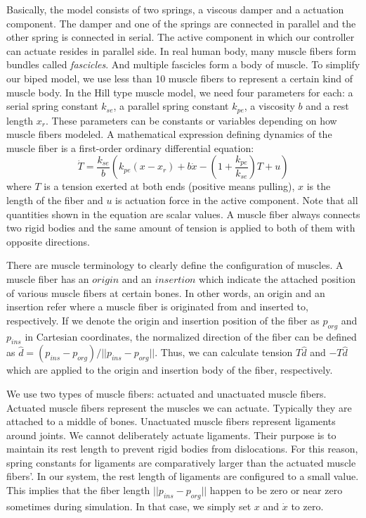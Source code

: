 \documentclass{acm_proc_article-sp}
\begin{document}
\noindent Basically, the model consists of two springs, a viscous damper and a actuation component.
The damper and one of the springs are connected in parallel and the other spring is
connected in serial. The active component in which our controller
can actuate resides in parallel side.
In real human body, many muscle fibers form bundles called \emph{fascicles}.
And multiple fascicles form a body of muscle.
To simplify our biped model, we use less than 10 muscle fibers to represent a certain kind of muscle body.
In the Hill type muscle model, we need four parameters for each:
a serial spring constant $k_{se}$, a parallel spring constant $k_{pe}$, a viscosity $b$ and a rest length $x_{r}$.
These parameters can be constants or variables depending on how muscle fibers modeled.
A mathematical expression defining dynamics of the muscle fiber is a first-order ordinary differential equation:
\begin{equation}\label{Tension}
\dot{T} = \frac{k_{se}}{b} \left( k_{pe}(x-x_{r})+b\dot{x}-\left(1+\frac{k_{pe}}{k_{se}}\right)T+u   \right)
\end{equation}
where $T$ is a tension exerted at both ends (positive means pulling), $x$ is the length of the fiber and $u$ is actuation force in the active component.
Note that all quantities shown in the equation are scalar values.
A muscle fiber always connects two rigid bodies and the same amount of
tension is applied to both of them with opposite directions.


There are muscle terminology to clearly define the configuration of muscles.
A muscle fiber has an $origin$ and an $insertion$ which indicate the attached position
of various muscle fibers at certain bones.
In other words, an origin and an insertion refer where a muscle fiber is originated from and inserted to, respectively.
If we denote the origin and insertion position of the fiber as $p_{org}$ and $p_{ins}$ in Cartesian coordinates,
the normalized direction of the fiber can be defined as $\hat{d}=(p_{ins}-p_{org})/||p_{ins}-p_{org}||$.
Thus, we can calculate tension $T\hat{d}$ and $-T\hat{d}$ which are applied to the origin and insertion body of the fiber, respectively.

We use two types of muscle fibers: actuated and unactuated muscle fibers.
Actuated muscle fibers represent the muscles we can actuate. Typically
they are attached to a middle of bones. Unactuated muscle fibers represent
ligaments around joints. We cannot deliberately actuate ligaments. Their
purpose is to maintain its rest length to prevent rigid bodies from
dislocations. For this reason, spring constants for ligaments are
comparatively larger than the actuated muscle fibers'.
In our system, the rest length of ligaments are configured to a small value.
This implies that the fiber length $||p_{ins}-p_{org}||$ happen to be zero
or near zero sometimes during simulation. In that case, we simply set
$x$ and $\dot{x}$ to zero.
\end{document}
